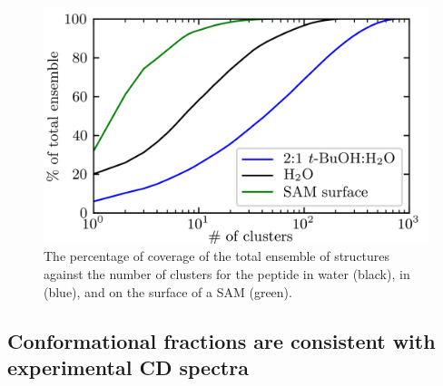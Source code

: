 \begin{figure}
    \center
    \includegraphics[width=\single]{figures-helix/clust-size.png}
    \caption{
        The percentage of coverage of the total ensemble of structures against the number of clusters for the peptide in water (black), in \tbawat{} (blue), and on the surface of a SAM (green).
    }
    \label{fig:helix-coverage}
\end{figure}

\subsection{Conformational fractions are consistent with experimental CD spectra}

